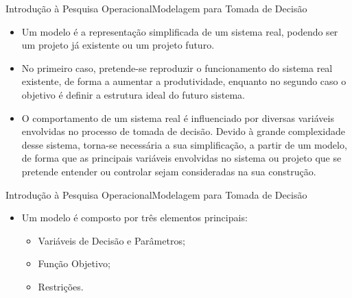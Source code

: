 \documentclass[t]{beamer}
\begin{document}
\begin{ftst}{Introdução à Pesquisa Operacional}{Modelagem para Tomada de Decisão}
\small
\begin{itemize}
    \item Um modelo é a representação simplificada de um sistema real, podendo ser um projeto já existente ou um projeto futuro.
    \vone
    \item No primeiro caso, pretende-se reproduzir o funcionamento do sistema real existente, de forma a aumentar a produtividade, enquanto no segundo caso o objetivo é definir a estrutura ideal do futuro sistema. 
    \vone
    \item O comportamento de um sistema real é influenciado por diversas variáveis envolvidas no processo de tomada de decisão. Devido à grande complexidade desse sistema, torna-se necessária a sua simplificação, a partir de um modelo, de forma que as principais variáveis envolvidas no sistema ou projeto que se pretende entender ou controlar sejam consideradas na sua construção.
\end{itemize}

\end{ftst}


\begin{ftst}{Introdução à Pesquisa Operacional}{Modelagem para Tomada de Decisão}

\begin{itemize}
    \item Um modelo é composto por três elementos principais: 
    \vone
    \begin{itemize}
        \item[a.] Variáveis de Decisão e Parâmetros;
        \vone
        \item[b.] Função Objetivo;
        \vone
        \item[c.] Restrições.
    \end{itemize}
    
\end{itemize}

\end{ftst}

\end{document}
